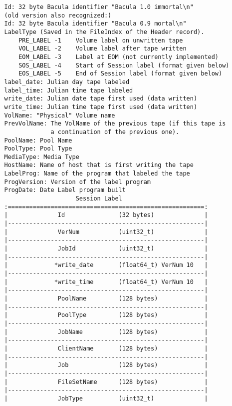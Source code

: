 \begin{verbatim}
   Id: 32 byte Bacula identifier "Bacula 1.0 immortal\n"
   (old version also recognized:)
   Id: 32 byte Bacula identifier "Bacula 0.9 mortal\n"
   LabelType (Saved in the FileIndex of the Header record).
       PRE_LABEL -1    Volume label on unwritten tape
       VOL_LABEL -2    Volume label after tape written
       EOM_LABEL -3    Label at EOM (not currently implemented)
       SOS_LABEL -4    Start of Session label (format given below)
       EOS_LABEL -5    End of Session label (format given below)
   label_date: Julian day tape labeled
   label_time: Julian time tape labeled
   write_date: Julian date tape first used (data written)
   write_time: Julian time tape first used (data written)
   VolName: "Physical" Volume name
   PrevVolName: The VolName of the previous tape (if this tape is
                a continuation of the previous one).
   PoolName: Pool Name
   PoolType: Pool Type
   MediaType: Media Type
   HostName: Name of host that is first writing the tape
   LabelProg: Name of the program that labeled the tape
   ProgVersion: Version of the label program
   ProgDate: Date Label program built
                       Session Label
   :=======================================================:
   |              Id               (32 bytes)              |
   |-------------------------------------------------------|
   |              VerNum           (uint32_t)              |
   |-------------------------------------------------------|
   |              JobId            (uint32_t)              |
   |-------------------------------------------------------|
   |             *write_date       (float64_t) VerNum 10   |
   |-------------------------------------------------------|
   |             *write_time       (float64_t) VerNum 10   |
   |-------------------------------------------------------|
   |              PoolName         (128 bytes)             |
   |-------------------------------------------------------|
   |              PoolType         (128 bytes)             |
   |-------------------------------------------------------|
   |              JobName          (128 bytes)             |
   |-------------------------------------------------------|
   |              ClientName       (128 bytes)             |
   |-------------------------------------------------------|
   |              Job              (128 bytes)             |
   |-------------------------------------------------------|
   |              FileSetName      (128 bytes)             |
   |-------------------------------------------------------|
   |              JobType          (uint32_t)              |

\end{verbatim}
